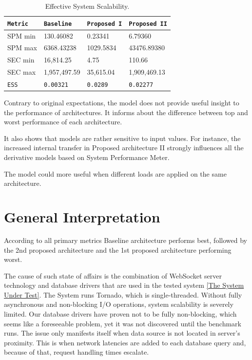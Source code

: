 \documentclass{uvamscse}
\begin{document}
\begin{table}[H]
\begin{center}
\begin{tabular}{llll}
  \texttt{Metric}               & \texttt{Baseline}   & \texttt{Proposed I}  & \texttt{Proposed II}  \\
  \hline
  SPM min                       & 130.46082           & 0.23341              & 6.79360                 \\
  SPM max                       & 6368.43238          & 1029.5834            & 43476.89380                 \\
  \hline
  SEC min                       & 16,814.25           & 4.75                 & 110.66         \\
  SEC max                       & 1,957,497.59        & 35,615.04            & 1,909,469.13         \\
  \hline
  \texttt{ESS}                   & \texttt{0.00321}     & \texttt{0.0289}      & \texttt{0.02277}
\end{tabular}
\end{center}
\caption{Effective System Scalability.}
\label{table:ess}
\end{table}

Contrary to original expectations, the model does not provide useful insight to the performance of architectures. It informs about the difference between top and worst performance of each architecture.

It also shows that models are rather sensitive to input values. For instance, the increased internal transfer in Proposed architecture II strongly influences all the derivative models based on System Performance Meter.

The model could more useful when different loads are applied on the same architecture.

\section{General Interpretation}

According to all primary metrics Baseline architecture performs best, followed by the 2nd proposed architecture and the 1st proposed architecture performing worst.

The cause of such state of affairs is the combination of WebSocket server technology and database drivers that are used in the tested system \ref{The System Under Test}. The System runs Tornado, which is single-threaded. Without fully asynchronous and non-blocking I/O operations, system scalability is severely limited. Our database drivers have proven not to be fully non-blocking, which seems like a foreseeable problem, yet it was not discovered until the benchmark runs. The issue only manifests itself when data source is not located in server's proximity. This is when network latencies are added to each database query and, because of that, request handling times escalate.
\end{document}
